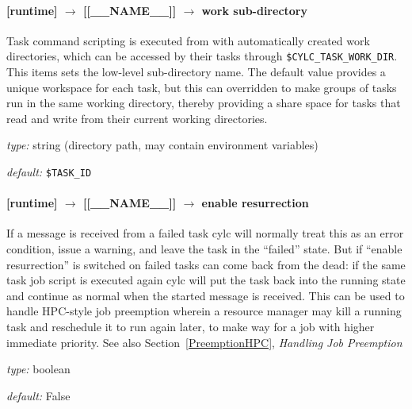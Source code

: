 
\paragraph[work directory]{[runtime] $\rightarrow$ [[\_\_NAME\_\_]] $\rightarrow$ work sub-directory}

Task command scripting is executed from with automatically created work
directories, which can be accessed by their tasks through
\lstinline=$CYLC_TASK_WORK_DIR=.  This items sets the low-level
sub-directory name. The default value provides a unique workspace for
each task, but this can overridden to make groups of tasks run in the
same working directory, thereby providing a share space for tasks that
read and write from their current working directories.

\begin{myitemize}
\item {\em type:} string (directory path, may contain environment variables)
\item {\em default:} \lstinline=$TASK_ID=
\end{myitemize}

\paragraph[enable resurrection]{ [runtime] $\rightarrow$ [[\_\_NAME\_\_]] $\rightarrow$ enable resurrection}

If a message is received from a failed task cylc will normally treat
this as an error condition, issue a warning, and leave the task in the
``failed'' state.  But if ``enable resurrection'' is switched on failed
tasks can come back from the dead: if the same task job script is
executed again cylc will put the task back into the running state and
continue as normal when the started message is received. This can be
used to handle HPC-style job preemption wherein a resource manager may
kill a running task and reschedule it to run again later, to make way
for a job with higher immediate priority. See also
Section~\ref{PreemptionHPC}, {\em Handling Job Preemption}
\begin{myitemize}
\item {\em type:} boolean
\item {\em default:} False
\end{myitemize}


